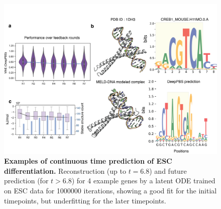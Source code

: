 \begin{center}
\begin{figure}[H]
  \includegraphics[width=\linewidth]{./pdnafigs/figS9.png}
    \caption[Examples of continuous time prediction of ESC differentiation.]{\textbf{Examples of continuous time prediction of ESC differentiation.} Reconstruction (up to $t=6.8$) and future prediction (for $t>6.8$) for 4 example genes by a  latent ODE \citep{chen2018neural} trained on ESC data \citep{Klein2015} for 1000000 iterations, showing a good fit for the initial timepoints, but underfitting for the later timepoints.}
  \label{fig:pdnaS9}
\end{figure}
\end{center}

